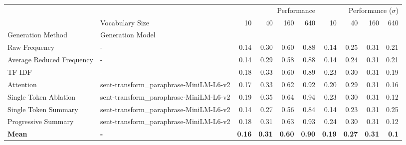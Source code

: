 \begin{tabular}{llrrrrrrrr}
\toprule
 &  & \multicolumn{4}{r}{Performance} & \multicolumn{4}{r}{Performance ($\sigma$)} \\
 & Vocabulary Size & 10 & 40 & 160 & 640 & 10 & 40 & 160 & 640 \\
Generation Method & Generation Model &  &  &  &  &  &  &  &  \\
\midrule
Raw Frequency & - & 0.14 & 0.30 & 0.60 & 0.88 & 0.14 & 0.25 & 0.31 & 0.21 \\
\cline{1-10}
Average Reduced Frequency & - & 0.14 & 0.29 & 0.58 & 0.88 & 0.14 & 0.24 & 0.31 & 0.21 \\
\cline{1-10}
TF-IDF & - & 0.18 & 0.33 & 0.60 & 0.89 & 0.23 & 0.30 & 0.31 & 0.19 \\
\cline{1-10}
Attention & sent-transform\_paraphrase-MiniLM-L6-v2 & 0.17 & 0.33 & 0.62 & 0.92 & 0.20 & 0.29 & 0.31 & 0.16 \\
\cline{1-10}
Single Token Ablation & sent-transform\_paraphrase-MiniLM-L6-v2 & 0.19 & 0.35 & 0.64 & 0.94 & 0.23 & 0.30 & 0.31 & 0.12 \\
\cline{1-10}
Single Token Summary & sent-transform\_paraphrase-MiniLM-L6-v2 & 0.14 & 0.27 & 0.56 & 0.84 & 0.14 & 0.23 & 0.31 & 0.25 \\
\cline{1-10}
Progressive Summary & sent-transform\_paraphrase-MiniLM-L6-v2 & 0.18 & 0.31 & 0.63 & 0.93 & 0.24 & 0.30 & 0.31 & 0.12 \\
\cline{1-10}
\midrule
\textbf{Mean} & \textbf{-} & \textbf{0.16} & \textbf{0.31} & \textbf{0.60} & \textbf{0.90} & \textbf{0.19} & \textbf{0.27} & \textbf{0.31} & \textbf{0.1} \\
\cline{1-10}
\bottomrule
\end{tabular}


